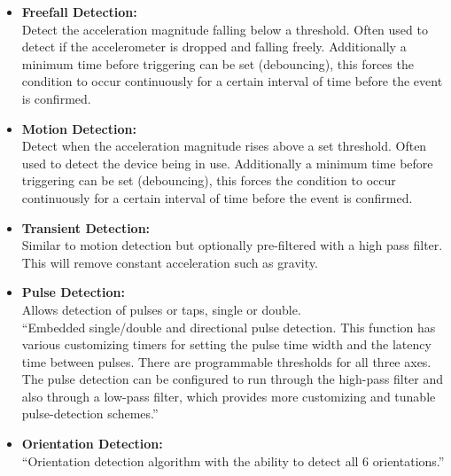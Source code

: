 \documentclass{article}
\begin{document}
\begin{itemize}[noitemsep,nolistsep]
	\item {\bf Freefall Detection:} \\ Detect the acceleration magnitude falling below a threshold. Often used to detect if the accelerometer is dropped and falling freely. Additionally a minimum time before triggering can be set (debouncing), this forces the condition to occur continuously for a certain interval of time before the event is confirmed.
	\item {\bf Motion Detection:} \\ Detect when the acceleration magnitude rises above a set threshold. Often used to detect the device being in use. Additionally a minimum time before triggering can be set (debouncing), this forces the condition to occur continuously for a certain interval of time before the event is confirmed.
	\item {\bf Transient Detection:} \\ Similar to motion detection but optionally pre-filtered with a high pass filter. This will remove constant acceleration such as gravity.
	\item {\bf Pulse Detection:} \\ Allows detection of pulses or taps, single or double. \\ ``Embedded single/double and directional pulse detection. This function has various customizing timers for setting the pulse time width and the latency time between pulses. There are programmable thresholds for all three axes. The pulse detection can be configured to run through the high-pass filter and also through a low-pass filter, which provides more customizing and tunable pulse-detection schemes.''
	\item {\bf Orientation Detection:} \\ ``Orientation detection algorithm with the ability to detect all 6 orientations.''
\end{itemize}
\end{document}
